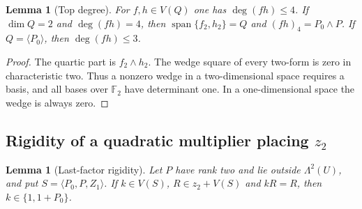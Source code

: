 \documentclass[11pt,a4paper]{article}
\theoremstyle{plain}
\newtheorem{lemma}[theorem]{Lemma}
\theoremstyle{remark}
\newcommand{\F}{\mathbb F_2}
\newcommand{\Span}{\operatorname{span}}
\begin{document}
\begin{lemma}[Top degree]\label{l2:lem:degree}
For $f,h\in V(Q)$ one has $\deg(fh)\le4$. If $\dim Q=2$ and $\deg(fh)=4$, then $\Span\{f_2,h_2\}=Q$ and $(fh)_4=P_0\wedge P$. If $Q=\langle P_0\rangle$, then $\deg(fh)\le3$.
\end{lemma}
\begin{proof}
The quartic part is $f_2\wedge h_2$. The wedge square of every two-form is zero in characteristic two. Thus a nonzero wedge in a two-dimensional space requires a basis, and all bases over $\F$ have determinant one. In a one-dimensional space the wedge is always zero.
\end{proof}

\subsection[Rigidity of a quadratic multiplier placing z2]{Rigidity of a quadratic multiplier placing $z_2$}
\begin{lemma}[Last-factor rigidity]\label{l2:lem:lastfactor}
Let $P$ have rank two and lie outside $\Lambda^2(U)$, and put $S=\langle P_0,P,Z_1\rangle$. If $k\in V(S)$, $R\in z_2+V(S)$ and $kR=R$, then $k\in\{1,1+P_0\}$.
\end{lemma}
\end{document}
